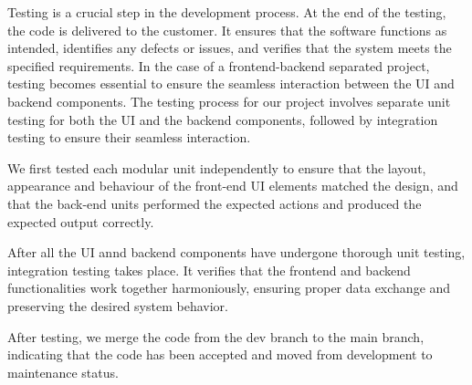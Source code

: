 {Testing is a crucial step in the development process. At the end of the
testing, the code is delivered to the customer. It ensures that the
software functions as intended, identifies any defects or issues, and
verifies that the system meets the specified requirements. In the case
of a frontend-backend separated project, testing becomes essential to
ensure the seamless interaction between the UI and backend components.
The testing process for our project involves separate unit testing for
both the UI and the backend components, followed by integration testing
to ensure their seamless interaction.

We first tested each modular unit independently to ensure that the
layout, appearance and behaviour of the front-end UI elements matched
the design, and that the back-end units performed the expected actions
and produced the expected output correctly.

After all the UI annd backend components have undergone thorough unit
testing, integration testing takes place. It verifies that the frontend
and backend functionalities work together harmoniously, ensuring proper
data exchange and preserving the desired system behavior.

After testing, we merge the code from the dev branch to the main branch,
indicating that the code has been accepted and moved from development to
maintenance status.
}
